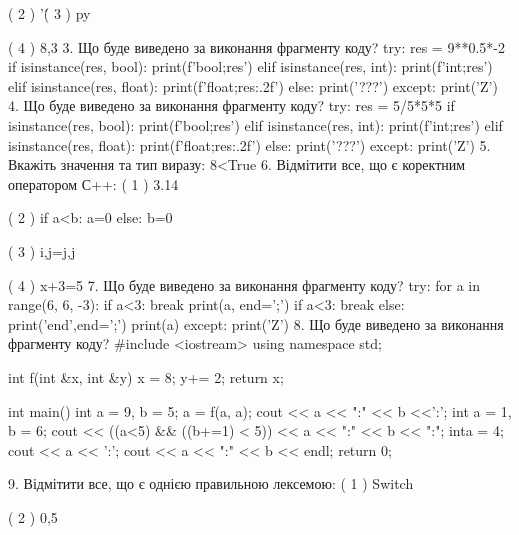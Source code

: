 \documentclass[11pt]{article}
\begin{document}
( 2 ) '\'

( 3 ) py

( 4 ) 8,3
\vspace{5mm}
3. Що буде виведено за виконання фрагменту коду?
try:
    res = 9**0.5*-2
    if isinstance(res, bool):
        print(f'bool;{res}')
    elif isinstance(res, int):
        print(f'int;{res}')
    elif isinstance(res, float):
        print(f'float;{res:.2f}')
    else:
        print('???')
except:
    print('Z')
\vspace{5mm}
4. Що буде виведено за виконання фрагменту коду?
try:
    res = 5/5*5*5
    if isinstance(res, bool):
        print(f'bool;{res}')
    elif isinstance(res, int):
        print(f'int;{res}')
    elif isinstance(res, float):
        print(f'float;{res:.2f}')
    else:
        print('???')
except:
    print('Z')
\vspace{5mm}
5. 
Вкажіть значення та тип виразу:
8<True
\vspace{5mm}
6. %
Відмітити все, що є коректним оператором С++:
( 1 ) 3.14%

( 2 ) if a<b: a=0 else: b=0

( 3 ) i,j=j,j

( 4 ) x+3=5
\vspace{5mm}
7. Що буде виведено за виконання фрагменту коду?
try:
    for a in range(6, 6, -3):
        if a<3:
            break
        print(a, end=';')
        if a<3:
            break
    else:
        print('end',end=';')
    print(a)
except:
    print('Z')
\vspace{5mm}
8. Що буде виведено за виконання фрагменту коду?
#include <iostream>
using namespace std;

int f(int &x, int &y){
    x = 8;
    y+= 2;
    return x;
}

int main(){
    int a = 9, b = 5;
    a = f(a, a);
    cout << a << ":" << b <<':';
    {
        int a = 1, b = 6;
        cout << ((a<5) && ((b+=1) < 5))
             << a << ":" << b << ":";
    }
    {
        inta = 4;
        cout << a << ':';
    }
    cout << a << ":" << b << endl;
    return 0;
}

\vspace{5mm}
9. %
Відмітити все, що є однією правильною лексемою:
( 1 ) Switch

( 2 ) 0,5
\end{document}
